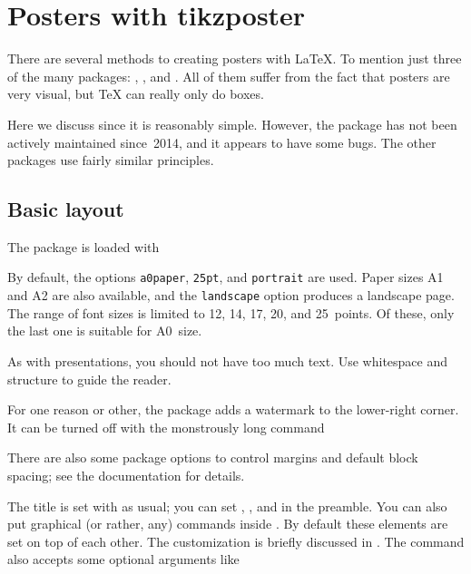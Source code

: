 \chapter{Posters with tikzposter}

There are several methods to creating posters with \LaTeX{}.
To mention just three of the many packages: , , and .
All of them suffer from the fact that posters are very visual,
but \TeX{} can really only do boxes.

Here we discuss  since it is reasonably simple.
However, the package has not been actively maintained since~2014,
and it appears to have some bugs.
The other packages use fairly similar principles.


%
%
\section{Basic layout}

The package is loaded with
%
%
By default, the options \verb|a0paper|, \verb|25pt|, and \verb|portrait| are used.
Paper sizes A1 and A2 are also available, and the \verb|landscape| option produces a landscape page.
The range of font sizes is limited to 12, 14, 17, 20, and 25~points.
Of these, only the last one is suitable for A0~size.

\begin{practices}
As with presentations, you should not have too much text.
Use whitespace and structure to guide the reader.
\end{practices}

For one reason or other, the package adds a watermark to the lower-right corner.
It can be turned off with the monstrously long command
%
\begin{ExampleCode}
\tikzposterlatexaffectionproofoff
\end{ExampleCode}
%
There are also some package options to control margins and default block spacing;
see the documentation for details.

The title is set with  as usual;
you can set , , and  in the preamble.
You can also put graphical (or rather, any) commands inside .
By default these elements are set on top of each other.
The customization is briefly discussed in .
The  command also accepts some optional arguments like
%
\begin{ExampleCode}
\maketitle[width=40cm]
\end{ExampleCode}



